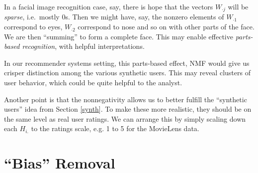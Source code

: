 In a facial image recognition case, say, there is hope that the vectors
$W_{\cdot j}$ will be {\it sparse}, i.e.\ mostly 0s. Then we might have,
say, the nonzero elements of $W_{\cdot 1}$ correspond to eyes, $W_{\cdot
2}$ correspond to nose and so on with other parts of the face.  We are
then ``summing'' to form a complete face.  This may enable effective
{\it parts-based recognition}, with helpful interpretations.

In our recommender systems setting, this parts-based effect, NMF would
give us crisper distinction among the various synthetic users.  This may
reveal clusters of user behavior, which could be quite helpful to the
analyst.

Another point is that the nonnegativity allows us to better fulfill the
``synthetic users'' idea from Section \ref{synth}.  To make these more
realistic, they should be on the same level as real user ratings.  We
can arrange this by simply scaling down each $H_{i.}$ to the ratings
scale, e.g. 1 to 5 for the MovieLens data.  

% 
% 
% 
% 

\section{``Bias'' Removal}


